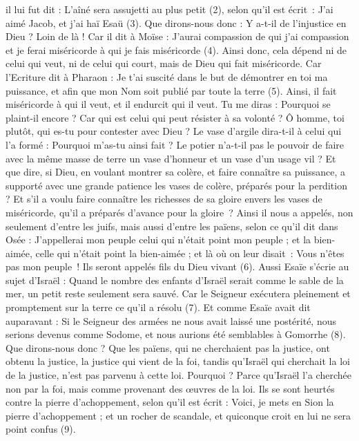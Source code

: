 \begin{multicols}{2}
il lui fut dit : L’aîné sera assujetti au plus petit (2), selon qu’il est écrit :
J'ai aimé Jacob, et j'ai haï Esaü (3).
Que dirons-nous donc : Y a-t-il de l’injustice en Dieu ? Loin de là !
Car il dit à Moïse : J'aurai compassion de qui j’ai compassion et je ferai miséricorde à qui je fais miséricorde (4).
Ainsi donc, cela dépend ni de celui qui veut, ni de celui qui court, mais de Dieu qui fait miséricorde.
Car l'Ecriture dit à Pharaon : Je t'ai suscité dans le but de démontrer en toi ma puissance, et afin que mon Nom soit publié par toute la terre (5).
Ainsi, il fait miséricorde à qui il veut, et il endurcit qui il veut.
Tu me diras : Pourquoi se plaint-il encore ? Car qui est celui qui peut résister à sa volonté ?
Ô homme, toi plutôt, qui es-tu pour contester avec Dieu ? Le vase d’argile dira-t-il à celui qui l'a formé : Pourquoi m'as-tu ainsi fait ?
Le potier n'a-t-il pas le pouvoir de faire avec la même masse de terre un vase d’honneur et un vase d’un usage vil ?
Et que dire, si Dieu, en voulant montrer sa colère, et faire connaître sa puissance, a supporté avec une grande patience les vases de colère, préparés pour la perdition ?
Et s’il a voulu faire connaître les richesses de sa gloire envers les vases de miséricorde, qu'il a préparés d’avance pour la gloire ?
Ainsi il nous a appelés, non seulement d'entre les juifs, mais aussi d'entre les païens,
selon ce qu'il dit dans Osée : J'appellerai mon peuple celui qui n'était point mon peuple ; et la bien-aimée, celle qui n'était point la bien-aimée ;
et là où on leur disait : Vous n’êtes pas mon peuple ! Ils seront appelés fils du Dieu vivant (6).
Aussi Esaïe s'écrie au sujet d'Israël : Quand le nombre des enfants d'Israël serait comme le sable de la mer, un petit reste seulement sera sauvé.
Car le Seigneur exécutera pleinement et promptement sur la terre ce qu’il a résolu (7).
Et comme Esaïe avait dit auparavant : Si le Seigneur des armées ne nous avait laissé une postérité, nous serions devenus comme Sodome, et nous aurions été semblables à Gomorrhe (8).
Que dirons-nous donc ? Que les païens, qui ne cherchaient pas la justice, ont obtenu la justice, la justice qui vient de la foi,
tandis qu’Israël qui cherchait la loi de la justice, n'est pas parvenu à cette loi.
Pourquoi ? Parce qu’Israël l’a cherchée non par la foi, mais comme provenant des œuvres de la loi. Ils se sont heurtés contre la pierre d'achoppement,
selon qu’il est écrit : Voici, je mets en Sion la pierre d'achoppement ; et un rocher de scandale, et quiconque croit en lui ne sera point confus (9).

\end{multicols}
